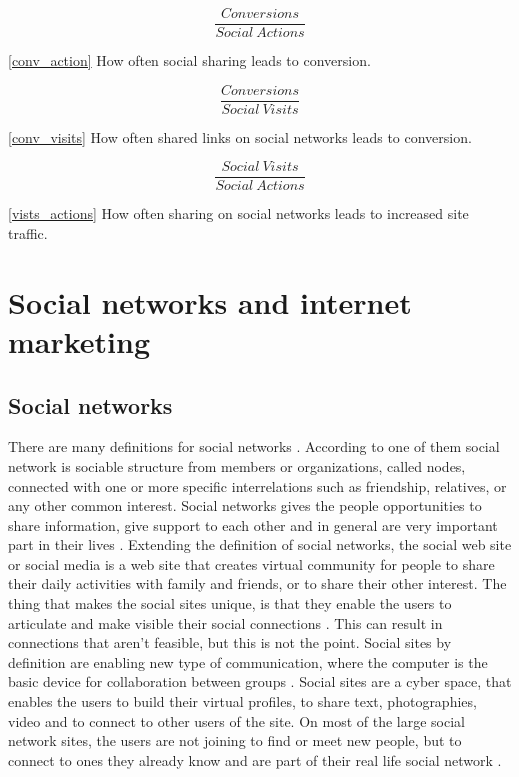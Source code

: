 \documentclass[conference]{IEEEtran}
\begin{document}
\begin{equation}
\label{conv_action}
\frac{Conversions}{Social\ Actions}
\end{equation}

\ref{conv_action} How often social sharing leads to conversion.

\begin{equation}
\label{conv_visits}
\frac{Conversions}{Social\ Visits}
\end{equation}

\ref{conv_visits} How often shared links on social networks leads to conversion.
 
\begin{equation}
\label{vists_actions}
\frac{Social\ Visits}{Social\ Actions}
\end{equation}

\ref{vists_actions} How often sharing on social networks leads to increased site traffic.

\section{Social networks and internet marketing}

\subsection{Social networks}

There are many definitions for social networks \cite{ting2010mining}. According
to one of them social network is sociable structure from members or
organizations, called nodes, connected with one or more specific interrelations
such as friendship, relatives, or any other common interest. Social networks
gives the people opportunities to share information, give support to each other
and in general are very important part in their lives \cite{chen2009usability}.
Extending the definition of social networks, the social web site
\cite{ellison2007social} or social media is a web site that creates virtual
community for people to share their daily activities with family and friends, or
to share their other interest. The thing that makes the social sites unique, is
that they enable the users to articulate and make visible their social
connections \cite{benevenuto2009characterizing}. This can result in connections
that aren't feasible, but this is not the point. Social sites by definition are
enabling new type of communication, where the computer is the basic device for
collaboration between groups \cite{lin2011people}. Social sites are a cyber
space, that enables the users to build their virtual profiles, to share text,
photographies, video and to connect to other users of the site. On most of the
large social network sites, the users are not joining to find or meet new
people, but to connect to ones they already know and are part of their real life
social network \cite{kwon2010empirical}.
\end{document}
